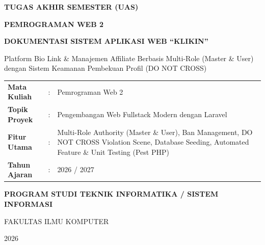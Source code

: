 \documentclass[12pt,a4paper]{article}
\begin{document}
\begin{titlepage}
    \hypersetup{pageanchor=false}
    \centering
    \vspace*{1.5cm}
    
    {\Huge \bfseries TUGAS AKHIR SEMESTER (UAS)\par}
    \vspace{0.4cm}
    {\LARGE \bfseries PEMROGRAMAN WEB 2\par}
    \vspace{1.2cm}
    
    \begin{tcolorbox}[
        colback=nbYellow,
        colframe=nbInk,
        boxrule=2.5pt,
        arc=0mm,
        width=0.95\textwidth,
        halign=center
    ]
        \vspace{0.3cm}
        {\LARGE \bfseries DOKUMENTASI SISTEM APLIKASI WEB ``KLIKIN''\par}
        \vspace{0.3cm}
        {\large Platform Bio Link \& Manajemen Affiliate Berbasis Multi-Role (Master \& User) dengan Sistem Keamanan Pembekuan Profil (DO NOT CROSS)\par}
        \vspace{0.2cm}
    \end{tcolorbox}
    
    \vspace{1.5cm}
    
    \begin{minipage}{\textwidth}
        \large
        \begin{tabularx}{\textwidth}{@{}p{3.5cm}p{0.3cm}X@{}}
            \textbf{Mata Kuliah} & : & Pemrograman Web 2 \\
            \textbf{Topik Proyek} & : & Pengembangan Web Fullstack Modern dengan Laravel \\
            \textbf{Fitur Utama} & : & Multi-Role Authority (Master \& User), Ban Management, DO NOT CROSS Violation Scene, Database Seeding, Automated Feature \& Unit Testing (Pest PHP) \\
            \textbf{Tahun Ajaran} & : & 2026 / 2027 \\
        \end{tabularx}
    \end{minipage}
    
    \vfill
    
    {\large \bfseries PROGRAM STUDI TEKNIK INFORMATIKA / SISTEM INFORMASI\par}
    {\large FAKULTAS ILMU KOMPUTER\par}
    \vspace{0.8cm}
    {\large 2026}
\end{titlepage}
\end{document}
